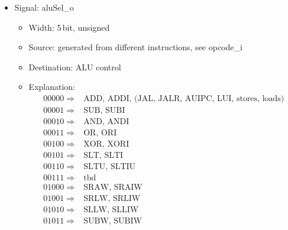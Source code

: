 \begin{itemize}
\begin{itemize}
\[\begin{array}{ll}
                                              001 \Rightarrow & \mbox{S-type} \\ 
                                              010 \Rightarrow & \mbox{B-type} \\ 
                                              011 \Rightarrow & \mbox{J-type} \\ 
                                              100 \Rightarrow & \mbox{U-type} 
                                              \end{array} \]
  \end{itemize}
  \item Signal: aluSel\_o
  \begin{itemize}
    \item Width: 5\,bit, unsigned
    \item Source: generated from different instructions, see opcode\_i
    \item Destination: ALU control
    \item Explanation: \[ \begin{array}{ll} 
                                              00000 \Rightarrow & \mbox{ADD, ADDI, (JAL, JALR, AUIPC, LUI, stores, loads)} \\ 
                                              00001 \Rightarrow & \mbox{SUB, SUBI} \\ 
                                              00010 \Rightarrow & \mbox{AND, ANDI} \\ 
                                              00011 \Rightarrow & \mbox{OR, ORI} \\ 
                                              00100 \Rightarrow & \mbox{XOR, XORI} \\ 
                                              00101 \Rightarrow & \mbox{SLT, SLTI} \\ 
                                              00110 \Rightarrow & \mbox{SLTU, SLTIU} \\ 
                                              00111 \Rightarrow & \mbox{tbd} \\ 
                                              01000 \Rightarrow & \mbox{SRAW, SRAIW} \\ 
                                              01001 \Rightarrow & \mbox{SRLW, SRLIW} \\ 
                                              01010 \Rightarrow & \mbox{SLLW, SLLIW} \\ 
                                              01011 \Rightarrow & \mbox{SUBW, SUBIW} \\ 

\end{array}\]
\end{itemize}
\end{itemize}
